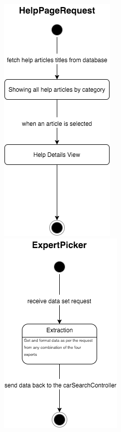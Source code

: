 \documentclass[12pt]{article}
\begin{document}
\includegraphics[scale=0.5]{helpPageRequest-sd.png}\\
\includegraphics[scale=0.5]{expertPicker-sd.png}\\
\end{document}
